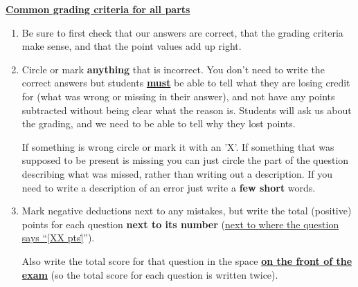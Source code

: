 \documentclass[11pt,fleqn]{article}
\begin{document}

  {

    \setlength{\leftmargini}{5mm}

    \vspace*{-6mm}

    \begin{info}{\textbf{\underline{\Large Common grading criteria for all
                 parts}}}

      \vspace*{-2mm}

      \enlargethispage{6mm}

      \setlength{\leftmarginii}{5mm}

      \begin{enumerate}

        \addtolength{\itemsep}{.5mm}

        \item Be sure to first check that our answers are correct, that the
          grading criteria make sense, and that the point values add up
          right.

        \item Circle or mark \textbf{anything} that is incorrect.  You don't
              need to write the correct answers but students
              \textbf{\underline{must}} be able to tell what they are losing
              credit for (what was wrong or missing in their answer), and not
              have any points subtracted without being clear what the reason
              is.  Students will ask us about the grading, and we need to be
              able to tell why they lost points.

              If something is wrong circle or mark it with an 'X'.  If
              something that was supposed to be present is missing you can
              just circle the part of the question describing what was missed,
              rather than writing out a description.  If you need to write a
              description of an error just write a \textbf{few short} words.

        \item Mark negative deductions next to any mistakes, but write the
              total (positive) points for each question \textbf{next to its
              number} (\underline{next to where the question says ``[XX
              pts\.]}'').

              Also write the total score for that question in the space
              \textbf{\underline{on the front of the exam}} (so the total
              score for each question is written twice).


\end{enumerate}
\end{info}}
\end{document}
